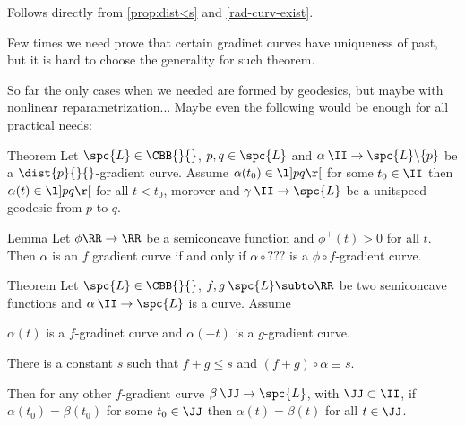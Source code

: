  Follows directly from \ref{prop:dist<s} and \ref{rad-curv-exist}. \qeds









Few times we need prove that certain gradinet curves have uniqueness of past, but it is hard to choose the generality for such theorem.

So far the only cases when we needed are formed by geodesics, but maybe with nonlinear reparametrization... Maybe even the following would be enough for all practical needs:

\begin{thm}{Theorem}
Let $\spc{L}\in\CBB{}{}$, 
$p,q\in \spc{L}$ 
and $\alpha\:\II\to\spc{L}\backslash\{p\}$ 
be a $\dist{p}{}{}$-gradient curve.
Assume $\alpha(t_0)\in\l]pq\r[$ for some $t_0\in \II$ then
$\alpha(t)\in \l]pq\r[$ for all $t<t_0$,
morover
and
$\gamma\:\II\to \spc{L}$ be a unitspeed geodesic from $p$ to $q$.

\end{thm}

\begin{thm}{Lemma}
Let $\phi\RR\to\RR$ be a semiconcave function and $\phi^+(t)>0$ for all $t$.
Then $\alpha$ is an $f$ gradient curve
if and only if $\alpha\circ???$ is a $\phi\circ f$-gradient curve. 
\end{thm}




\begin{thm}{Theorem}
Let $\spc{L}\in\CBB{}{}$,
$f,g\:\spc{L}\subto \RR$ be two semiconcave functions 
and $\alpha\:\II\to\spc{L}$ is a curve.
Assume 
\begin{subthm}{}
$\alpha(t)$ is a $f$-gradinet curve and $\alpha(-t)$ is a $g$-gradient curve.
\end{subthm}

\begin{subthm}{}
There is a constant $s$ such that $f+g\le s$ and $(f+g)\circ\alpha\equiv s$.
\end{subthm}
Then for any other $f$-gradient curve $\beta\:\JJ\to\spc{L}$,
with $\JJ\subset\II$, if $\alpha(t_0)=\beta(t_0)$ for some $t_0\in \JJ$ then $\alpha(t)=\beta(t)$ for all $t\in\JJ$.
\end{thm}



